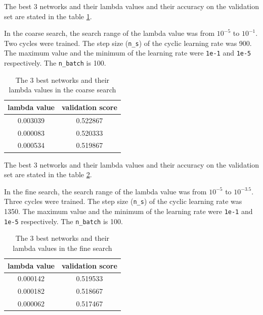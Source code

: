 \documentclass[12pt]{article}
\newenvironment{question}[2][Question]{\begin{trivlist}
\kern10pt
\item[\hskip \labelsep {\bfseries #1}\hskip \labelsep {\bfseries #2.}]}{\end{trivlist}}
\begin{document}
\begin{question}{iii}
The best 3 networks and their lambda values and their accuracy on the validation
set are stated in the table \ref{table:coarse_search_lambda}.

In the coarse search, the search range of the lambda value was from $10^{-5}$
to $10^{-1}$. Two cycles were trained. The step size (\texttt{n\_s})
of the cyclic learning rate was 900. The maximum value and the minimum of the
learning rate were \texttt{1e-1} and \texttt{1e-5} respectively. The
\texttt{n\_batch} is 100.

\begin{table}
    \centering
    \begin{tabular}{|c|c|}
    \hline
    lambda value & validation score \\ \hline
    0.003039 & 0.522867    \\ \hline
    0.000083 & 0.520333    \\ \hline
    0.000534 & 0.519867    \\ \hline
    \end{tabular}
    \caption{The 3 best networks and their lambda values in the coarse search}
    \label{table:coarse_search_lambda}
\end{table}
\end{question}

\begin{question}{iv}
    The best 3 networks and their lambda values and their accuracy on the validation
    set are stated in the table \ref{table:fine_search_lambda}.

    In the fine search, the search range of the lambda value was from $10^{-5}$
    to $10^{-3.5}$. Three cycles were trained. The step size (\texttt{n\_s})
    of the cyclic learning rate was 1350. The maximum value and the minimum of the
    learning rate were \texttt{1e-1} and \texttt{1e-5} respectively. The
    \texttt{n\_batch} is 100.

    \begin{table}
        \centering
        \begin{tabular}{|c|c|}
        \hline
        lambda value & validation score \\ \hline
        0.000142 & 0.519533    \\ \hline
        0.000182 & 0.518667    \\ \hline
        0.000062 & 0.517467    \\ \hline
        \end{tabular}
        \caption{The 3 best networks and their lambda values in the fine search}
        \label{table:fine_search_lambda}
    \end{table}
\end{question}
\end{document}

